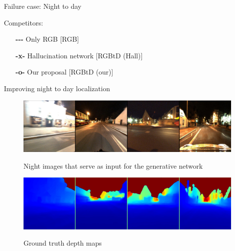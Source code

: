 \begin{frame}{Failure case: Night to day}
\begin{minipage}{0.2\linewidth}
			\vspace{0.5cm}	
			{\scriptsize
			Competitors:
			\begin{itemize}
				\item[\textbf{-{}-{}-}] Only RGB [RGB]
				\item[\textbf{-x-}] Hallucination network [RGBtD (Hall)]
				\item[\textbf{-o-}] Our proposal [RGBtD (our)]
			\end{itemize}
			}
	\end{minipage}
\end{frame}


\begin{frame}{Improving night to day localization}
	\begin{minipage}{0.80\linewidth}
	\begin{figure}
		\centering
		\begin{minipage}{0.74\linewidth}
			\includegraphics[width=\linewidth]{im/res/night_input}
		\end{minipage}
		\begin{minipage}{0.25\linewidth}
			\raggedright \footnotesize
			{Night images that serve as input for the generative network}
		\end{minipage}
	\end{figure}
	\vspace{-0.5cm}
	\begin{figure}
		\centering
		\begin{minipage}{0.74\linewidth}
			\includegraphics[width=\linewidth]{im/res/night_gt}
		\end{minipage}
		\begin{minipage}{0.25\linewidth}
			\raggedright \footnotesize
			{Ground truth depth maps}
		\end{minipage}
	\end{figure}	

\end{minipage}
\end{frame}

